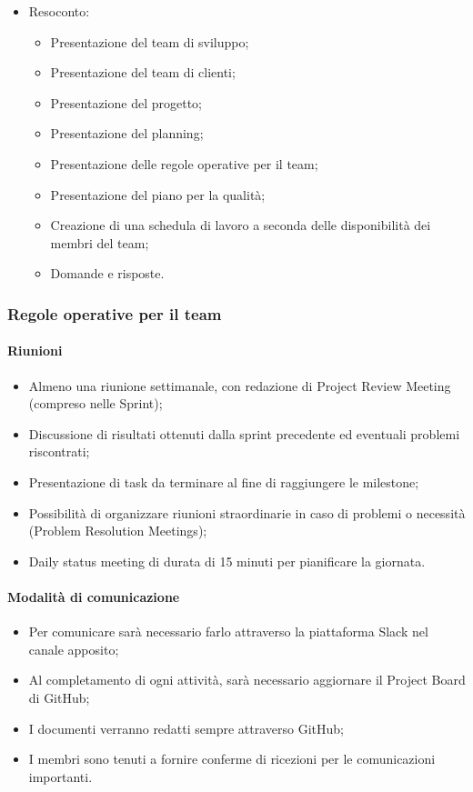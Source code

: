 \begin{itemize}
    \item Resoconto:
          \begin{itemize}
              \item Presentazione del team di sviluppo;
              \item Presentazione del team di clienti;
              \item Presentazione del progetto;
              \item Presentazione del planning;
              \item Presentazione delle regole operative per il team;
              \item Presentazione del piano per la qualità;
              \item Creazione di una schedula di lavoro a seconda delle disponibilità dei membri del team;
              \item Domande e risposte.
          \end{itemize}
\end{itemize}

\subsubsection{Regole operative per il team}
\paragraph{Riunioni}
\begin{itemize}
    \item Almeno una riunione settimanale, con redazione di Project Review Meeting (compreso nelle Sprint);
    \item Discussione di risultati ottenuti dalla sprint precedente ed eventuali problemi riscontrati;
    \item Presentazione di task da terminare al fine di raggiungere le milestone;
    \item Possibilità di organizzare riunioni straordinarie in caso di problemi o necessità (Problem Resolution Meetings);
    \item Daily status meeting di durata di 15 minuti per pianificare la giornata.
\end{itemize}

\paragraph{Modalità di comunicazione}
\begin{itemize}
    \item Per comunicare sarà necessario farlo attraverso la piattaforma Slack nel canale apposito;
    \item Al completamento di ogni attività, sarà necessario aggiornare il Project Board di GitHub;
    \item I documenti verranno redatti sempre attraverso GitHub;
    \item I membri sono tenuti a fornire conferme di ricezioni per le comunicazioni importanti.
\end{itemize}

